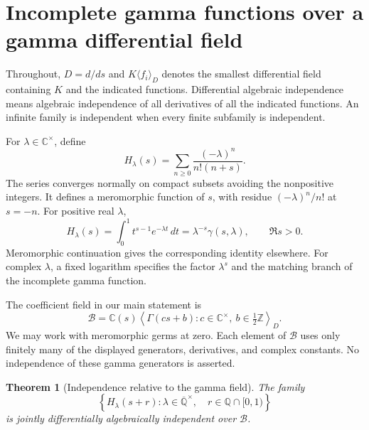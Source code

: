 \documentclass[11pt,a4paper]{article}
\newcommand{\Q}{\mathbb Q}
\newcommand{\C}{\mathbb C}
\newcommand{\B}{\mathscr B}
\newtheorem{theorem}{Theorem}[section]
\theoremstyle{definition}
\theoremstyle{remark}
\numberwithin{equation}{section}
\begin{document}
\section{Incomplete gamma functions over a gamma differential field}

Throughout, $D=d/ds$ and $K\langle f_i\rangle_D$ denotes the
smallest differential field containing $K$ and the indicated functions.
Differential algebraic independence means algebraic independence of
all derivatives of all the indicated functions. An infinite family is
independent when every finite subfamily is independent.

For $\lambda\in\C^\times$, define
\begin{equation}\label{diff:eq:H}
 H_\lambda(s)=\sum_{n\ge0}\frac{(-\lambda)^n}{n!(n+s)}.
\end{equation}
The series converges normally on compact subsets avoiding the
nonpositive integers. It defines a meromorphic function of $s$, with
residue $(-\lambda)^n/n!$ at $s=-n$. For positive real $\lambda$,
\begin{equation}\label{diff:eq:integral}
 H_\lambda(s)=\int_0^1 t^{s-1}e^{-\lambda t}\,dt
             =\lambda^{-s}\gamma(s,\lambda),\qquad \Re s>0.
\end{equation}
Meromorphic continuation gives the corresponding identity elsewhere.
For complex $\lambda$, a fixed logarithm specifies the factor
$\lambda^s$ and the matching branch of the incomplete gamma function.

The coefficient field in our main statement is
\begin{equation}\label{diff:eq:B}
 \B=\C(s)\left\langle
       \Gamma(cs+b):c\in\C^\times,\ b\in\tfrac12\mathbb Z
       \right\rangle_D.
\end{equation}
We may work with meromorphic germs at zero. Each element of $\B$ uses
only finitely many of the displayed generators, derivatives, and complex
constants. No independence of these gamma generators is asserted.

\begin{theorem}[Independence relative to the gamma field]\label{diff:thm:main}
The family
\begin{equation}\label{diff:eq:canonical}
 \left\{H_\lambda(s+r):
      \lambda\in\overline{\Q}^{\times},\quad
      r\in\Q\cap[0,1)\right\}
\end{equation}
is jointly differentially algebraically independent over $\B$.
\end{theorem}
\end{document}
